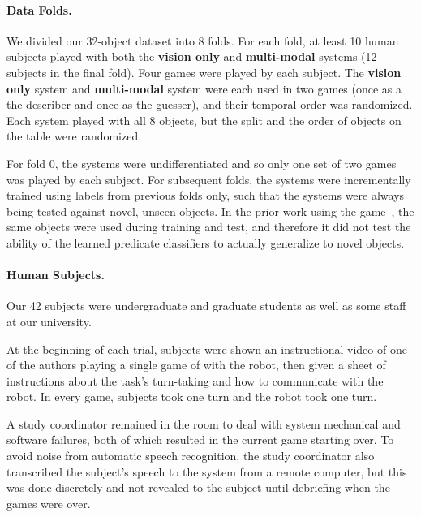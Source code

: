 \paragraph{Data Folds.}
We divided our 32-object dataset into 8 folds.
For each fold, at least 10 human subjects played \ispy with both the \textbf{vision only} and \textbf{multi-modal} systems (12 subjects in the final fold).
Four games were played by each subject.
The \textbf{vision only} system and \textbf{multi-modal} system were each used in two games (once as a the describer and once as the guesser), and their temporal order was randomized.
Each system played with all 8 objects, but the split and the order of objects on the table were randomized.

For fold 0, the systems were undifferentiated and so only one set of two games was played by each subject. 
For subsequent folds, the systems were incrementally trained using labels from previous folds only, such that the systems were always being tested against novel, unseen objects.
In the prior work using the \ispy game~\cite{parde:ijcai15}, the same objects were used during training and test, and therefore it did not test the ability of the learned predicate classifiers to actually generalize to novel objects.

\paragraph{Human Subjects.}

Our 42 subjects were undergraduate and graduate students as well as some staff at our university.

At the beginning of each trial, subjects were shown an instructional video of one of the authors playing a single game of \ispy with the robot, then given a sheet of instructions about the task's turn-taking and how to communicate with the robot. 
In every game, subjects took one turn and the robot took one turn.

A study coordinator remained in the room to deal with system mechanical and software failures, both of which resulted in the current game starting over.
To avoid noise from automatic speech recognition, the study coordinator also transcribed the subject's speech to the system from a remote computer, but this was done discretely and not revealed to the subject until debriefing when the games were over.
